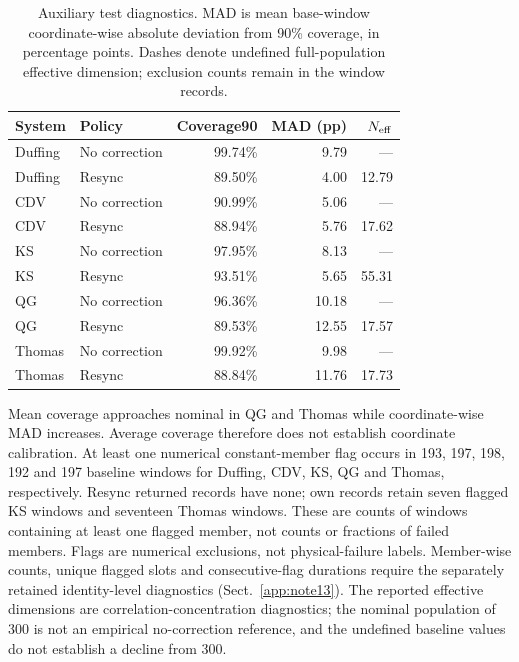 \documentclass[gmd,manuscript]{copernicus}
\begin{document}
\begin{table}[htbp]\caption{Auxiliary test diagnostics. MAD is mean base-window coordinate-wise absolute deviation from 90\% coverage, in percentage points. Dashes denote undefined full-population effective dimension; exclusion counts remain in the window records.}\label{tab:followup-auxiliary}
\centering\small\begin{tabular}{llrrr}\toprule
System & Policy & Coverage90 & MAD (pp) & $N_{\rm eff}$\\\midrule
Duffing & No correction & 99.74\% & 9.79 & --- \\
Duffing & Resync & 89.50\% & 4.00 & 12.79 \\
CDV & No correction & 90.99\% & 5.06 & --- \\
CDV & Resync & 88.94\% & 5.76 & 17.62 \\
KS & No correction & 97.95\% & 8.13 & --- \\
KS & Resync & 93.51\% & 5.65 & 55.31 \\
QG & No correction & 96.36\% & 10.18 & --- \\
QG & Resync & 89.53\% & 12.55 & 17.57 \\
Thomas & No correction & 99.92\% & 9.98 & --- \\
Thomas & Resync & 88.84\% & 11.76 & 17.73 \\
\bottomrule\end{tabular}\end{table}
Mean coverage approaches nominal in QG and Thomas while coordinate-wise MAD increases. Average coverage therefore does not establish coordinate calibration. At least one numerical constant-member flag occurs in 193, 197, 198, 192 and 197 baseline windows for Duffing, CDV, KS, QG and Thomas, respectively. Resync returned records have none; own records retain seven flagged KS windows and seventeen Thomas windows. These are counts of windows containing at least one flagged member, not counts or fractions of failed members. Flags are numerical exclusions, not physical-failure labels. Member-wise counts, unique flagged slots and consecutive-flag durations require the separately retained identity-level diagnostics (Sect.~\ref{app:note13}). The reported effective dimensions are correlation-concentration diagnostics; the nominal population of 300 is not an empirical no-correction reference, and the undefined baseline values do not establish a decline from 300.
\end{document}
